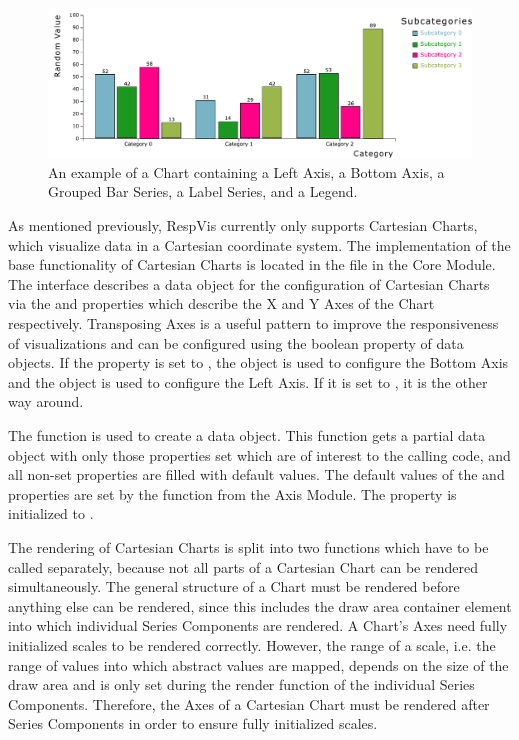 \begin{figure}[tp]
\centering
\includegraphics[keepaspectratio,width=\linewidth,height=\fullh]
{diagrams/chart.pdf}
\caption[Chart Example]{%
An example of a Chart containing a Left Axis, a Bottom Axis,
a Grouped Bar Series, a Label Series, and a Legend.
}
\label{fig:Chart}
\end{figure}


As mentioned previously, RespVis currently only supports Cartesian
Charts, which visualize data in a Cartesian coordinate system. The
implementation of the base functionality of  Cartesian Charts is
located in the  file in the Core Module. The
 interface describes a data object for the
configuration of Cartesian Charts via the  and
  properties which describe the X and Y Axes of
the Chart respectively. Transposing Axes is a useful pattern to
improve the responsiveness of visualizations and can be configured
using the  boolean property of 
data objects. If the  property is set to ,
the  object is used to configure the Bottom Axis and the
 object is used to configure the Left Axis. If it is set
to , it is the other way around.

The  function is used to create a
 data object. This function gets a partial data
object with only those properties set which are of interest to the
calling code, and all non-set properties are filled with default
values. The default values of the  and 
properties are set by the  function from the Axis
Module. The  property is initialized to .

The rendering of Cartesian Charts is split into two functions which
have to be called separately, because not all parts of a Cartesian
Chart can be rendered simultaneously. The general structure of a Chart
must be rendered before anything else can be rendered, since this
includes the draw area container element into which individual Series
Components are rendered. A Chart's Axes need fully initialized scales
to be rendered correctly. However, the range of a scale, i.e. the
range of values into which abstract values are mapped, depends on the
size of the draw area and is only set during the render function of
the individual Series Components. Therefore, the Axes of a Cartesian
Chart must be rendered after Series Components in order to ensure
fully initialized scales.

